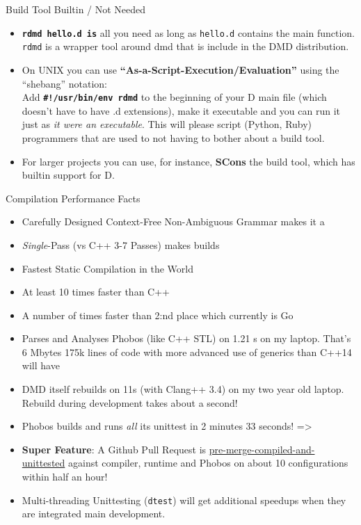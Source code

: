 \documentclass[xcolor=dvipsnames]{beamer}
\begin{document}
\begin{frame}[fragile]{Build Tool Builtin / Not Needed}
  \begin{itemize}[<+->]
  \item \textbf{\texttt{rdmd hello.d is}} all you need as long as
    \texttt{hello.d} contains the main function. \texttt{rdmd} is a wrapper tool
    around dmd that is include in the DMD distribution.
  \item On UNIX you can use \textbf{“As-a-Script-Execution/Evaluation”} using
    the ``shebang'' notation:\\Add \textbf{\textbf{\texttt{\#!/usr/bin/env
          rdmd}}} to the beginning of your D main file (which doesn't have to
    have .d extensions), make it executable and you can run it just as
    \textit{it were an executable}. This will please script (Python, Ruby)
    programmers that are used to not having to bother about a build tool.
  \item For larger projects you can use, for instance, \textbf{SCons} the build
    tool, which has builtin support for D.
  \end{itemize}
\end{frame}

\begin{frame}[fragile]{Compilation Performance Facts}
  \begin{itemize}[<+->]
  \item Carefully Designed Context-Free Non-Ambiguous Grammar makes it a
  \item \emph{Single}-Pass (vs C++ 3-7 Passes) makes builds
  \item Fastest Static Compilation in the World
  \item At least 10 times faster than C++
  \item A number of times faster than 2:nd place which currently is Go
  \item Parses and Analyses Phobos (like C++ STL) on 1.21 s on my laptop. That’s 6 Mbytes
    175k lines of code with more advanced use of generics than C++14 will have
  \item DMD itself rebuilds on 11s (with Clang++ 3.4) on my two year old
    laptop. Rebuild during development takes about a second!
  \item Phobos builds and runs \emph{all} its unittest in 2 minutes 33 seconds! =>
  \item \textbf{Super Feature}: A Github Pull Request is
    \href{https://d.puremagic.com/test-results/pull-history.ghtml?projectid=1&repoid=1&pullid=3342}{pre-merge-compiled-and-unittested}
    against compiler, runtime and Phobos on about 10 configurations within half
    an hour!
  \item Multi-threading Unittesting (\texttt{dtest}) will get additional
    speedups when they are integrated main development.
  \end{itemize}
\end{frame}
\end{document}
